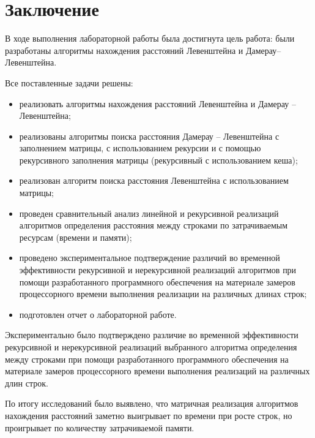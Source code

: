 \chapter*{Заключение}

В ходе выполнения лабораторной работы была достигнута цель работа: были разработаны алгоритмы нахождения расстояний Левенштейна и Дамерау--Левенштейна.

Все поставленные задачи решены:

\begin{itemize}
    \item реализовать алгоритмы нахождения расстояний Левенштейна и Дамерау -- Левенштейна;
	\item реализованы алгоритмы поиска расстояния Дамерау -- Левенштейна с заполнением матрицы, с использованием рекурсии и с помощью рекурсивного заполнения матрицы (рекурсивный с использованием кеша);
	\item реализован алгоритм поиска расстояния Левенштейна с использованием матрицы;
	\item проведен сравнительный анализ линейной и рекурсивной реализаций алгоритмов определения расстояния между строками по затрачиваемым ресурсам (времени и памяти);
	\item проведено экспериментальное подтверждение различий во временной эффективности рекурсивной и нерекурсивной реализаций алгоритмов при помощи разработанного программного обеспечения на материале замеров процессорного времени выполнения реализации на различных длинах строк;
	\item подготовлен отчет о лабораторной работе.
\end{itemize}

Экспериментально было подтверждено различие во временной эффективности рекурсивной и нерекурсивной реализаций выбранного алгоритма определения между строками при помощи разработанного программного обеспечения на материале замеров процессорного времени выполнения реализаций на различных длин строк.

По итогу исследований было выявлено, что матричная реализация алгоритмов нахождения расстояний заметно выигрывает по времени при росте строк, но проигрывает по количеству затрачиваемой памяти.

